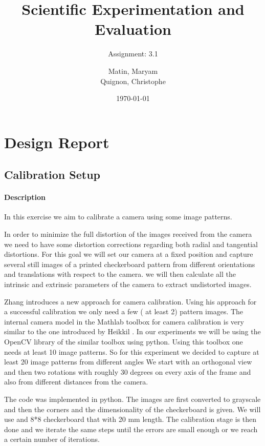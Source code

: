 \documentclass{scrartcl}
\begin{document}
\title{Scientific Experimentation and Evaluation
}
\subtitle{
Assignment: 3.1}
\author{
  Matin, Maryam \\
  Quignon, Christophe
}
\date{\today}


\maketitle


\section{Design Report}

\subsection{Calibration Setup}
\paragraph{Description}

In this exercise we aim to calibrate a camera using some image patterns.

In order to minimize the full distortion of the images received from the camera we need to have some distortion corrections regarding both radial and tangential distortions. For this goal we will set our camera at a fixed position and capture several still images of a printed checkerboard pattern from different orientations and translations with respect to the camera. we will then calculate all the intrinsic and extrinsic parameters of the camera to extract undistorted images. 

Zhang\cite{zhang}  introduces a new approach for camera calibration. Using his approach for a successful calibration we only need a few ( at least 2) pattern images. The internal camera model in the Mathlab toolbox for camera calibration is very similar to the one introduced by Heikkil \cite{heikkila}. In our experiments we will be using the OpenCV library of the similar toolbox using python. Using this toolbox one needs at least 10 image patterns. So for this experiment we decided to capture at least 20 image patterns from different angles We start with an orthogonal view and then two rotations with roughly 30 degrees on every axis of the frame and also from different distances from the camera.

The code was implemented in python. The images are first converted to grayscale and then the corners and the dimensionality of the checkerboard is given. We will use and 8*8 checkerboard that with 20 mm length. The calibration stage is then done and we iterate the same steps until the errors are small enough or we reach a certain number of iterations.
\end{document}
